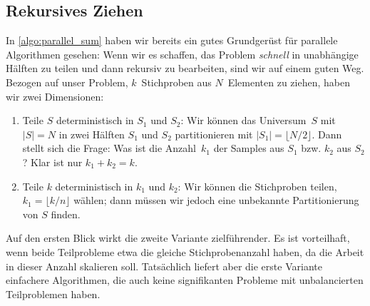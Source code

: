 \subsection{Rekursives Ziehen}
In \cref{algo:parallel_sum} haben wir bereits ein gutes Grundgerüst für parallele Algorithmen gesehen:
Wenn wir es schaffen, das Problem \emph{schnell} in unabhängige Hälften zu teilen und dann rekursiv zu bearbeiten, sind wir auf einem guten Weg.
Bezogen auf unser Problem, $k$~Stichproben aus $N$~Elementen zu ziehen, haben wir zwei Dimensionen:
\begin{enumerate}
    \item Teile $S$ deterministisch in $S_1$ und $S_2$: Wir können das Universum~$S$ mit $|S| = N$ in zwei Hälften $S_1$ und $S_2$ partitionieren mit $|S_1| = \lfloor N / 2 \rfloor$.
          Dann stellt sich die Frage: Was ist die Anzahl~$k_1$ der Samples aus $S_1$ bzw. $k_2$ aus $S_2$? Klar ist nur $k_1 + k_2 = k$.

    \item Teile $k$ deterministisch in $k_1$ und $k_2$: Wir können die Stichproben teilen, \dh $k_1 = \lfloor k/n \rfloor$ wählen; dann müssen wir jedoch eine unbekannte Partitionierung von $S$ finden.
\end{enumerate}

Auf den ersten Blick wirkt die zweite Variante zielführender.
Es ist vorteilhaft, wenn beide Teilprobleme etwa die gleiche Stichprobenanzahl haben, da die Arbeit in dieser Anzahl skalieren soll.
Tatsächlich liefert aber die erste Variante einfachere Algorithmen, die auch keine signifikanten Probleme mit unbalancierten Teilproblemen haben.

